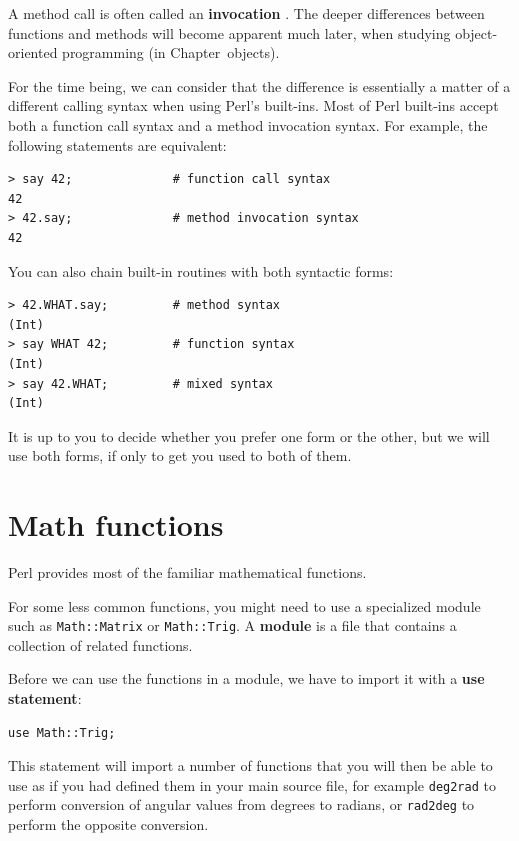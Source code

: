 A method call is often called an {\bf invocation}
. The deeper differences between functions and
methods will become apparent much later, when studying 
object-oriented programming (in Chapter~{objects}).

For the time being, we can consider that the difference is 
essentially a matter of a different calling syntax when using Perl's 
built-ins. Most of Perl built-ins accept both a function 
call syntax and a method invocation syntax. For example, 
the following statements are equivalent:

\begin{verbatim}
> say 42;              # function call syntax
42
> 42.say;              # method invocation syntax
42
\end{verbatim}
%

You can also chain built-in routines with both syntactic 
forms:

\begin{verbatim}
> 42.WHAT.say;         # method syntax
(Int)
> say WHAT 42;         # function syntax
(Int)
> say 42.WHAT;         # mixed syntax
(Int)
\end{verbatim}
%

It is up to you to decide whether you prefer one form or the 
other, but we will use both forms, if only to get you used to 
both of them.

\section{Math functions}

Perl provides most of the familiar mathematical functions.

For some less common functions, you might need to use a 
specialized module such as \verb'Math::Matrix' or 
\verb'Math::Trig'.  A {\bf module} is a file that contains a
collection of related functions.

Before we can use the functions in a module, we have to import it with
a {\bf use statement}:

\begin{verbatim}
use Math::Trig;
\end{verbatim}
%
This statement will import a number of functions that you will then be able to use as if you had defined them in your main source file, for example \verb'deg2rad' to perform conversion of angular values from degrees to radians, or \verb'rad2deg' to perform the opposite conversion.

